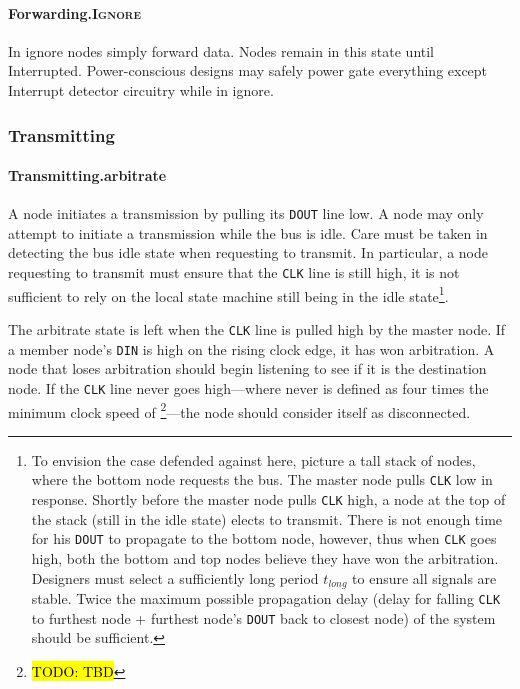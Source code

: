 \paragraph{Forwarding.\textsc{Ignore}}
In {\sc ignore} nodes simply forward data. Nodes remain in this state until
Interrupted. Power-conscious designs may safely power gate everything
except Interrupt detector circuitry while in {\sc ignore}.

\subsubsection{Transmitting}

\paragraph{Transmitting.{\sc arbitrate}}
\label{sec:state-arbitrate}
A node initiates a transmission by pulling its {\tt DOUT} line low. A node may
only attempt to initiate a transmission while the bus is idle. Care must be
taken in detecting the bus idle state when requesting to transmit. In
particular, a node requesting to transmit must ensure that the {\tt CLK} line
is still high, it is not sufficient to rely on the local state machine still
being in the {\sc idle} state\footnote{To envision the case defended against
here, picture a tall stack of nodes, where the bottom node requests the bus.
The master node pulls {\tt CLK} low in response. Shortly before the master
node pulls {\tt CLK} high, a node at the top of the stack (still in the {\sc
idle} state) elects to transmit. There is not enough time for his {\tt DOUT}
to propagate to the bottom node, however, thus when {\tt CLK} goes high, both
the bottom and top nodes believe they have won the arbitration. Designers must
select a sufficiently long period $t_{long}$ to ensure all signals are stable.
Twice the maximum possible propagation delay (delay for falling {\tt CLK} to
furthest node + furthest node's {\tt DOUT} back to closest node) of the system
should be sufficient.}.

The {\sc arbitrate} state is left when the {\tt CLK} line is pulled high by
the master node. If a member node's {\tt DIN} is high on the rising clock
edge, it has won arbitration. A node that loses arbitration should begin
listening to see if it is the destination node. If the {\tt CLK} line never
goes high---where never is defined as four times the minimum clock speed of
\bus\footnote{\hl{TODO: TBD}}---the node should consider itself as
disconnected.

